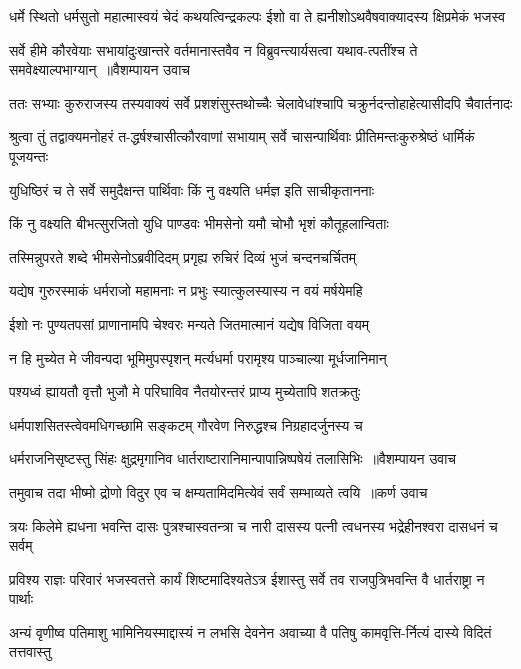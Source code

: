 \twolineshloka
{धर्मे स्थितो धर्मसुतो महात्मास्वयं चेदं कथयत्विन्द्रकल्पः}
{ईशो वा ते ह्यनीशोऽथवैषवाक्यादस्य क्षिप्रमेकं भजस्व}


\twolineshloka
{सर्वे हीमे कौरवेयाः सभायांदुःखान्तरे वर्तमानास्तवैव}
{न विब्रुवन्त्यार्यसत्वा यथाव-त्पतींश्च ते समवेक्ष्याल्पभाग्यान् ॥वैशम्पायन उवाच}


\twolineshloka
{ततः सभ्याः कुरुराजस्य तस्यवाक्यं सर्वे प्रशशंसुस्तथोच्चैः}
{चेलावेधांश्चापि चक्रुर्नदन्तोहाहेत्यासीदपि चैवार्तनादः}


\twolineshloka
{श्रुत्वा तुं तद्वाक्यमनोहरं त-द्धर्षश्चासीत्कौरवाणां सभायाम्}
{सर्वे चासन्पार्थिवाः प्रीतिमन्तःकुरुश्रेष्ठं धार्मिकं पूजयन्तः}


\twolineshloka
{युधिष्ठिरं च ते सर्वे समुदैक्षन्त पार्थिवाः}
{किं नु वक्ष्यति धर्मज्ञ इति साचीकृताननाः}


\twolineshloka
{किं नु वक्ष्यति बीभत्सुरजितो युधि पाण्डवः}
{भीमसेनो यमौ चोभौ भृशं कौतूहलान्विताः}


\twolineshloka
{तस्मिन्नुपरते शब्दे भीमसेनोऽब्रवीदिदम्}
{प्रगृह्य रुचिरं दिव्यं भुजं चन्दनचर्चितम्}


\twolineshloka
{यद्येष गुरुरस्माकं धर्मराजो महामनाः}
{न प्रभुः स्यात्कुलस्यास्य न वयं मर्षयेमहि}


\twolineshloka
{ईशो नः पुण्यतपसां प्राणानामपि चेश्वरः}
{मन्यते जितमात्मानं यद्येष विजिता वयम्}


\twolineshloka
{न हि मुच्येत मे जीवन्पदा भूमिमुपस्पृशन्}
{मर्त्यधर्मा परामृश्य पाञ्चाल्या मूर्धजानिमान्}


\twolineshloka
{पश्यध्वं ह्यायतौ वृत्तौ भुजौ मे परिघाविव}
{नैतयोरन्तरं प्राप्य मुच्येतापि शतक्रतुः}


\twolineshloka
{धर्मपाशसितस्त्वेवमधिगच्छामि सङ्कटम्}
{गौरवेण निरुद्धश्च निग्रहादर्जुनस्य च}


\twolineshloka
{धर्मराजनिसृष्टस्तु सिंहः क्षुद्रमृगानिव}
{धार्तराष्टारानिमान्पापान्निष्पषेयं तलासिभिः ॥वैशम्पायन उवाच}


\twolineshloka
{तमुवाच तदा भीष्मो द्रोणो विदुर एव च}
{क्षम्यतामिदमित्येवं सर्वं सम्भाव्यते त्वयि ॥कर्ण उवाच}


\threelineshloka
{त्रयः किलेमे ह्यधना भवन्ति}
{दासः पुत्रश्चास्वतन्त्रा च नारी}
{दासस्य पत्नी त्वधनस्य भद्रेहीनश्वरा दासधनं च सर्वम्}


\twolineshloka
{प्रविश्य राज्ञः परिवारं भजस्वतत्ते कार्यं शिष्टमादिश्यतेऽत्र}
{ईशास्तु सर्वे तव राजपुत्रिभवन्ति वै धार्तराष्ट्रा न पार्थाः}


\twolineshloka
{अन्यं वृणीष्व पतिमाशु भामिनियस्माद्दास्यं न लभसि देवनेन}
{अवाच्या वै पतिषु कामवृत्ति-र्नित्यं दास्ये विदितं तत्तवास्तु}


